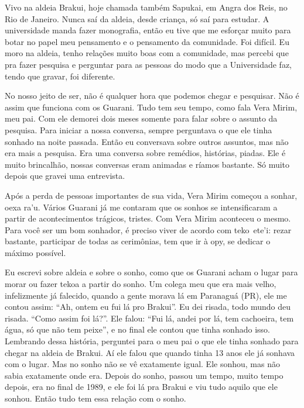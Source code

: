 Vivo na aldeia Brakui, hoje chamada também Sapukai, em Angra dos Reis,
no Rio de Janeiro. Nunca saí da aldeia, desde criança, só saí para
estudar. A universidade manda fazer monografia, então eu tive que me
esforçar muito para botar no papel meu pensamento e o pensamento da
comunidade. Foi difícil. Eu moro na aldeia, tenho relações muito boas
com a comunidade, mas percebi que pra fazer pesquisa e perguntar para
as pessoas do modo que a Universidade faz, tendo que gravar, foi
diferente.

No nosso jeito de ser, não é qualquer hora que podemos chegar e
pesquisar. Não é assim que funciona com os Guarani. Tudo tem seu tempo,
como fala Vera Mirim, meu pai. Com ele demorei dois meses somente para
falar sobre o assunto da pesquisa. Para iniciar a nossa conversa,
sempre perguntava o que ele tinha sonhado na noite passada. Então eu
conversava sobre outros assuntos, mas não era mais a pesquisa. Era uma
conversa sobre remédios, histórias, piadas. Ele é muito brincalhão,
nossas conversas eram animadas e ríamos bastante. Só muito depois que
gravei uma entrevista. 

Após a perda de pessoas importantes de sua vida, Vera Mirim começou a
sonhar, oexa ra’u. Vários Guarani já me contaram que os sonhos se
intensificaram a partir de acontecimentos trágicos, tristes. Com Vera
Mirim aconteceu o mesmo. Para você ser um bom sonhador, é preciso viver
de acordo com teko~ete’i: rezar bastante, participar de todas as
cerimônias, tem que ir à opy, se dedicar o máximo possível.

Eu escrevi sobre aldeia e sobre o sonho, como que os Guarani acham o
lugar para morar ou fazer tekoa a partir do sonho. Um colega meu que
era mais velho, infelizmente já falecido, quando a gente morava lá em
Paranaguá (PR), ele me contou assim: ``Ah, ontem eu fui lá pro Brakui''.
Eu dei risada, todo mundo deu risada. ``Como assim foi lá?''. Ele falou:
``Fui lá, andei por lá, tem cachoeira, tem água, só que não tem peixe'',
e no final ele contou que tinha sonhado isso. Lembrando dessa história,
perguntei para o meu pai o que ele tinha sonhado para chegar na aldeia
de Brakui. Aí ele falou que quando tinha 13 anos ele já sonhava com o
lugar. Mas no sonho não se vê exatamente igual. Ele sonhou, mas não
sabia exatamente onde era. Depois do sonho, passou um tempo, muito
tempo depois, era no final de 1989, e ele foi lá pra Brakui e viu tudo
aquilo que ele sonhou. Então tudo tem essa relação com o sonho.

